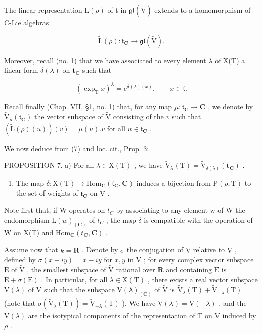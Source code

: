 The linear representation \(\mathrm{L}(\rho)\) of t in \(\mathfrak{gl}(\tilde{\mathrm{V}})\) extends to a homomorphism of C-Lie algebras

\[
\tilde {\mathrm{L}} (\rho): \mathfrak {t} _ {\mathbf {C}} \to \mathfrak {g l} (\tilde {\mathrm{V}}).
\]

Moreover, recall (no. 1) that we have associated to every element \(\lambda\) of X(T) a linear form \(\delta (\lambda)\) on \(\mathbf{t}_{\mathbf{C}}\) such that

\[
(\exp_ {\mathrm{T}} x) ^ {\lambda} = e ^ {\delta (\lambda) (x)}, \qquad x \in \mathfrak {t}.\tag{10}
\]

Recall finally (Chap. VII, §1, no. 1) that, for any map \(\mu : \mathfrak{t}_{\mathbf{C}} \to \mathbf{C}\) , we denote by \(\tilde{\mathrm{V}}_{\mu}(\mathfrak{t}_{\mathbf{C}})\) the vector subspace of \(\tilde{\mathrm{V}}\) consisting of the \(v\) such that \((\tilde{\mathrm{L}}(\rho)(u))(v) = \mu(u).v\) for all \(u \in \mathfrak{t}_{\mathbf{C}}\) .

We now deduce from (7) and loc. cit., Prop. 3:

PROPOSITION 7. a) For all \(\lambda \in \mathrm{X(T)}\) , we have \(\tilde{\mathrm{V}}_{\lambda}(\mathrm{T}) = \tilde{\mathrm{V}}_{\delta (\lambda)}(\mathbf{t}_{\mathbf{C}})\) .

\begin{enumerate}
\def\labelenumi{\alph{enumi})}
\setcounter{enumi}{1}
\tightlist
\item
  The map \(\delta : \mathrm{X(T)} \to \mathrm{Hom}_{\mathbf{C}}(\mathfrak{t}_{\mathbf{C}}, \mathbf{C})\) induces a bijection from \(\mathrm{P}(\rho, \mathrm{T})\) to the set of weights of \(\mathfrak{t}_{\mathbf{C}}\) on \(\tilde{\mathrm{V}}\) .
\end{enumerate}

Note first that, if W operates on \(t_{C}\) by associating to any element w of W the endomorphism \(\mathrm{L}(w)_{(\mathbf{C})}\) of \(t_{C}\) , the map \(\delta\) is compatible with the operation of W on X(T) and \(\mathrm{Hom}_{\mathbf{C}}(t_{\mathbf{C}}, \mathbf{C})\) .

Assume now that \(k = \mathbf{R}\) . Denote by \(\sigma\) the conjugation of \(\tilde{\mathrm{V}}\) relative to \(\mathrm{V}\) , defined by \(\sigma(x + iy) = x - iy\) for \(x, y\) in \(\mathrm{V}\) ; for every complex vector subspace \(\mathrm{E}\) of \(\tilde{\mathrm{V}}\) , the smallest subspace of \(\tilde{\mathrm{V}}\) rational over \(\mathbf{R}\) and containing \(\mathrm{E}\) is \(\mathrm{E} + \sigma(\mathrm{E})\) . In particular, for all \(\lambda \in \mathrm{X}(\mathrm{T})\) , there exists a real vector subspace \(\mathrm{V}(\lambda)\) of \(\mathrm{V}\) such that the subspace \(\mathrm{V}(\lambda)_{(\mathbf{C})}\) of \(\tilde{\mathrm{V}}\) is \(\tilde{\mathrm{V}}_{\lambda}(\mathrm{T}) + \tilde{\mathrm{V}}_{-\lambda}(\mathrm{T})\) (note that \(\sigma(\tilde{\mathrm{V}}_{\lambda}(\mathrm{T})) = \tilde{\mathrm{V}}_{-\lambda}(\mathrm{T})\) ). We have \(\mathrm{V}(\lambda) = \mathrm{V}(-\lambda)\) , and the \(\mathrm{V}(\lambda)\) are the isotypical components of the representation of \(\mathrm{T}\) on \(\mathrm{V}\) induced by \(\rho\) .


